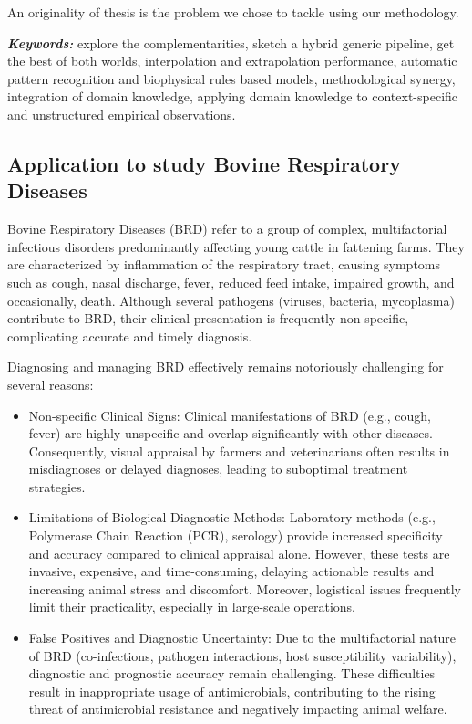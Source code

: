 An originality of thesis is the problem we chose to tackle using our methodology. 

\textit{\textbf{Keywords:}} explore the complementarities, sketch a hybrid generic pipeline, get the best of both worlds, interpolation and extrapolation performance, automatic pattern recognition and biophysical rules based models, methodological synergy, integration of domain knowledge, applying domain knowledge to context-specific and unstructured empirical observations.

\subsection{Application to study Bovine Respiratory Diseases}

Bovine Respiratory Diseases (BRD) refer to a group of complex, multifactorial infectious disorders predominantly affecting young cattle in fattening farms. They are characterized by inflammation of the respiratory tract, causing symptoms such as cough, nasal discharge, fever, reduced feed intake, impaired growth, and occasionally, death. Although several pathogens (viruses, bacteria, mycoplasma) contribute to BRD, their clinical presentation is frequently non-specific, complicating accurate and timely diagnosis.

Diagnosing and managing BRD effectively remains notoriously challenging for several reasons:
\begin{itemize}
    \item Non-specific Clinical Signs: Clinical manifestations of BRD (e.g., cough, fever) are highly unspecific and overlap significantly with other diseases. Consequently, visual appraisal by farmers and veterinarians often results in misdiagnoses or delayed diagnoses, leading to suboptimal treatment strategies.
    \item Limitations of Biological Diagnostic Methods: Laboratory methods (e.g., Polymerase Chain Reaction (PCR), serology) provide increased specificity and accuracy compared to clinical appraisal alone. However, these tests are invasive, expensive, and time-consuming, delaying actionable results and increasing animal stress and discomfort. Moreover, logistical issues frequently limit their practicality, especially in large-scale operations.
    \item False Positives and Diagnostic Uncertainty: Due to the multifactorial nature of BRD (co-infections, pathogen interactions, host susceptibility variability), diagnostic and prognostic accuracy remain challenging. These difficulties result in inappropriate usage of antimicrobials, contributing to the rising threat of antimicrobial resistance and negatively impacting animal welfare.
\end{itemize}

